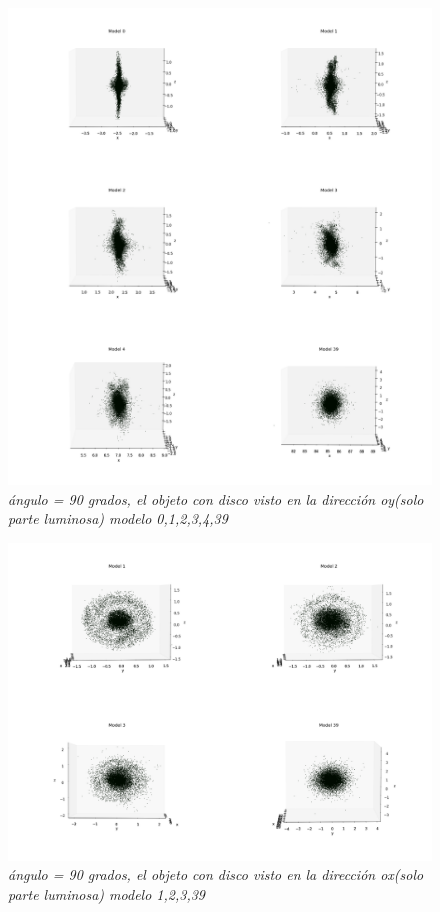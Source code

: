 \documentclass[12pt]{article} %
\renewcommand{\=}[1]{\stackrel{#1}{=}} %
\theoremstyle{definition}
\theoremstyle{remark}
\begin{document}
\begin{figure}[!ht]
 \centering
 \includegraphics[scale=0.2]{90deg-m-c2y.png}
 \caption{\emph{ ángulo = 90 grados, el objeto con disco visto en la dirección oy(solo parte luminosa) modelo 0,1,2,3,4,39 }}
\end{figure}

\begin{figure}[!ht]
 \centering
 \includegraphics[scale=0.2]{90deg-m-c2.png}
 \caption{\emph{ ángulo = 90 grados, el objeto con disco visto en la dirección ox(solo parte luminosa) modelo 1,2,3,39 }}
\end{figure}
\end{document}

